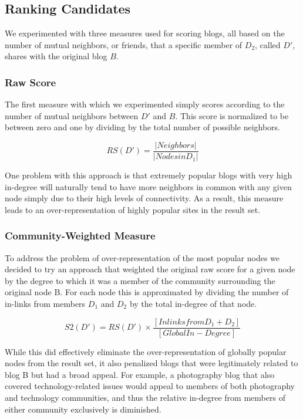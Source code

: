 \documentclass{sig-alternate}
\begin{document}
\subsection{Ranking Candidates}
We experimented with three measures used for scoring blogs, all based
on the number of mutual neighbors, or friends, that a specific member
of $D_2$, called $D'$, shares with the original blog $B$.

\subsubsection{Raw Score}
The first  measure with which we experimented  simply scores according
to the  number of mutual  neighbors between $D'$  and $B$.  This  score is
normalized to be between zero and  one by dividing by the total number
of possible neighbors.

\begin{equation}
RS(D') = \frac{\lvert Neighbors \rvert}{\lvert Nodes in D_1 \rvert}
\end{equation}

One problem with this approach is that extremely popular blogs with
very high in-degree will naturally tend to have more neighbors in
common with any given node simply due to their high levels of
connectivity.  As a result, this measure leads to an
over-representation of highly popular sites in the result set.

\subsubsection{Community-Weighted Measure}
To address the problem of over-representation of the most popular
nodes we decided to try an approach that weighted the original raw
score for a given node by the degree to which it was a member of the
community surrounding the original node B.  For each node this is
approximated by dividing the number of in-links from members $D_1$ and $D_2$
by the total in-degree of that node.

\begin{equation}
S2(D') = RS(D') \times \frac{[Inlinks from D_1 + D_2]}{[ Global In-Degree]}
\end{equation}

While this did effectively eliminate the over-representation of
globally popular nodes from the result set, it also penalized blogs
that were legitimately related to blog B but had a broad appeal.  For
example, a photography blog that also covered technology-related
issues would appeal to members of both photography and technology
communities, and thus the relative in-degree from members of either
community exclusively is diminished.
\end{document}
